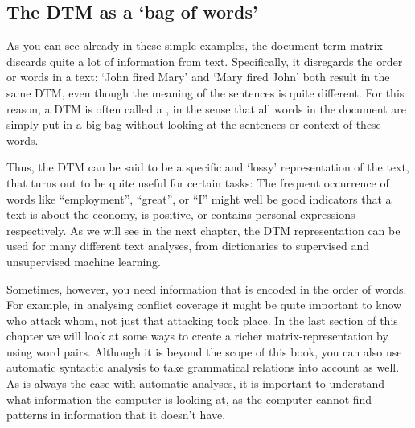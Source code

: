 \subsection{The DTM as a `bag of words'}


As you can see already in these simple examples, the document-term matrix discards quite a lot of information from text.
Specifically, it disregards the order or words in a text: `John fired Mary' and `Mary fired John' both result in the same DTM,
even though the meaning of the sentences is quite different.
For this reason, a DTM is often called a , in the sense that all words in the document are simply put in a big bag
without looking at the sentences or context of these words. 

Thus, the DTM can be said to be a specific and `lossy' representation of the text, that turns out to be quite useful for certain tasks:
The frequent occurrence of words like ``employment'', ``great'', or ``I'' might well be good indicators that a text is about the economy,
is positive, or contains personal expressions respectively.
As we will see in the next chapter, the DTM representation can be used for many different text analyses, from dictionaries to supervised and unsupervised machine learning.

Sometimes, however, you need information that is encoded in the order of words.
For example, in analysing conflict coverage it might be quite important to know who attack whom, not just that attacking took place.
In the last section of this chapter we will look at some ways to create a richer matrix-representation by using word pairs.
Although it is beyond the scope of this book,
you can also use automatic syntactic analysis to take grammatical relations into account as well.
As is always the case with automatic analyses, it is important to understand what information the computer is looking at,
as the computer cannot find patterns in information that it doesn't have.
